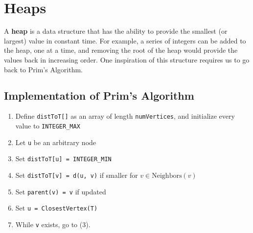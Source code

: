\documentclass[10pt]{article}
\begin{document}
\section*{Heaps}
A \textbf{heap} is a data structure that has the ability to provide the smallest (or largest) value in constant time.  For example, a series of integers can be added to the heap, one at a time, and removing the root of the heap would provide the values back in increasing order.  One inspiration of this structure requires us to go back to Prim's Algorithm.

\subsection*{Implementation of Prim's Algorithm}
\begin{enumerate}
	\item Define \texttt{distToT[]} as an array of length \texttt{numVertices}, and initialize every value to \texttt{INTEGER\_MAX}
	\item Let \texttt{u} be an arbitrary node
	\item Set \texttt{distToT[u] = INTEGER\_MIN}
	\item Set \texttt{distToT[v] = d(u, v)} if smaller for $v \in \text{Neighbors}(v)$
	\item Set \texttt{parent(v) = v} if updated
	\item Set \texttt{u = ClosestVertex(T)}
	\item While \texttt{v} exists, go to (3).
\end{enumerate}
\end{document}
